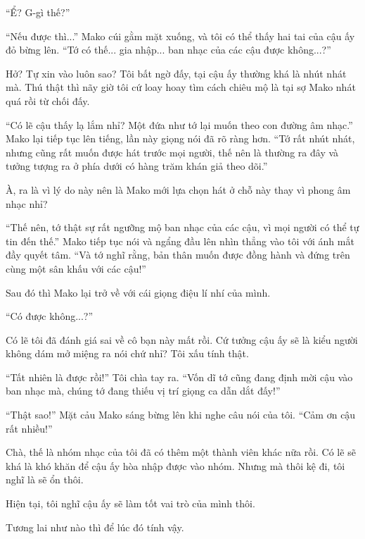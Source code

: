 {``Ể? G-gì thế?''

``Nếu được thì...'' Mako cúi gằm mặt xuống, và tôi có thể thấy hai tai
của cậu ấy đỏ bừng lên. ``Tớ có thế... gia nhập... ban nhạc của các cậu
được không...?''

Hở? Tự xin vào luôn sao? Tôi bất ngờ đấy, tại cậu ấy thường khá là nhút
nhát mà. Thú thật thì nãy giờ tôi cứ loay hoay tìm cách chiêu mộ là tại
sợ Mako nhát quá rồi từ chối đấy.

``Có lẽ cậu thấy lạ lắm nhỉ? Một đứa như tớ lại muốn theo con đường âm
nhạc.'' Mako lại tiếp tục lên tiếng, lần này giọng nói đã rõ ràng hơn.
``Tớ rất nhút nhát, nhưng cũng rất muốn được hát trước mọi người, thế
nên là thường ra đây và tưởng tượng ra ở phía dưới có hàng trăm khán giả
theo dõi.''

À, ra là vì lý do này nên là Mako mới lựa chọn hát ở chỗ này thay vì
phong âm nhạc nhỉ?

``Thế nên, tớ thật sự rất ngưỡng mộ ban nhạc của các cậu, vì mọi người
có thể tự tin đến thế.'' Mako tiếp tục nói và ngẩng đầu lên nhìn thẳng
vào tôi với ánh mắt đầy quyết tâm. ``Và tớ nghĩ rằng, bản thân muốn được
đồng hành và đứng trên cùng một sân khấu với các cậu!''

Sau đó thì Mako lại trở về với cái giọng điệu lí nhí của mình.

``Có được không...?''

Có lẽ tôi đã đánh giá sai về cô bạn này mất rồi. Cứ tưởng cậu ấy sẽ là
kiểu người không dám mở miệng ra nói chứ nhỉ? Tôi xấu tính thật.

``Tất nhiên là được rồi!'' Tôi chìa tay ra. ``Vốn dĩ tớ cũng đang định
mời cậu vào ban nhạc mà, chúng tớ đang thiếu vị trí giọng ca dẫn dắt
đấy!''

``Thật sao!'' Mặt cảu Mako sáng bừng lên khi nghe câu nói của tôi. ``Cảm
ơn cậu rất nhiều!''

Chà, thế là nhóm nhạc của tôi đã có thêm một thành viên khác nữa rồi. Có
lẽ sẽ khá là khó khăn để cậu ấy hòa nhập được vào nhóm. Nhưng mà thôi kệ
đi, tôi nghĩ là sẽ ổn thôi.

Hiện tại, tôi nghĩ cậu ấy sẽ làm tốt vai trò của mình thôi.

Tương lai như nào thì để lúc đó tính vậy.
}